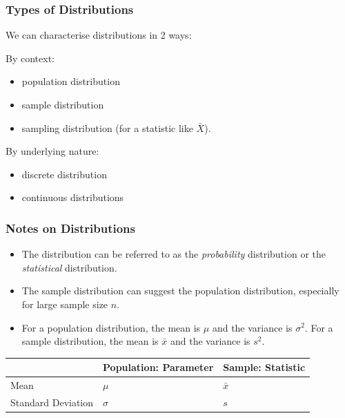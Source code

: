 \documentclass[t,xcolor=pdftex,dvipsnames,table]{beamer}
\begin{document}
\begin{frame}\frametitle{Types of Distributions}

\begin{definition}
We can characterise distributions in 2 ways:

\vspace{.5cm}
By \alert{context}:
\begin{itemize}
\item population distribution
\item sample distribution
\item sampling distribution (for a statistic like $\bar{X}$).
\end{itemize}

\vspace{.5cm}
By \alert{underlying nature}:
\begin{itemize}
\item discrete distribution 
\item continuous distributions
\end{itemize}
\end{definition}
\end{frame}

\begin{frame}\frametitle{Notes on Distributions}
\begin{itemize}
\item
The distribution can be referred to as the {\it probability} distribution or the {\it statistical} distribution.
\item The sample distribution can suggest the population distribution, especially for large sample size $n$. 
\item For a population distribution, the mean is $\mu$ and the variance is $\sigma^2$. For a sample distribution, the mean is $\bar{x}$ and the variance is $s^2$.
\end{itemize}

\vspace{.5cm}
\begin{tabular}{l|l|l}
 & Population: Parameter & Sample: Statistic \\ \hline
Mean & $\mu$ & $\bar{x}$ \\ \hline
Standard Deviation & $\sigma$ & $s$ \\ \hline
\end{tabular}


\end{frame}
\end{document}
